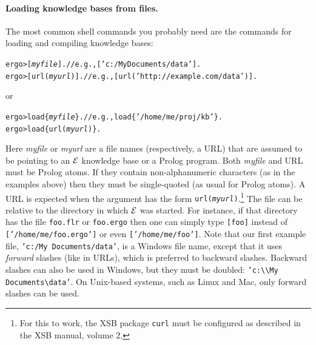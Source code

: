 \documentclass[11pt]{article}
\newcommand{\ERGO}{\mbox{\ensuremath{\cal{E}}\smaller{{\sc{RGO}}}}\xspace}
\newcommand{\FLSYSTEM}{\ERGO}
\newcommand{\prompt}{ergo> }
\newcommand{\flrext}{flr\xspace}
\newcommand{\ergoext}{ergo\xspace}
\newcommand{\bs}{\textbackslash}
\begin{document}
\paragraph{Loading knowledge bases from files.}
The most common shell commands you probably need are the commands for
loading and compiling knowledge bases:
\begin{alltt}
  \prompt  [\textnormal{\textit{myfile}}].        // e.g., ['c:/My Documents/data'].
  \prompt  [url(\textnormal{\textit{myurl}})].    // e.g., [url('http://example.com/data')].
\end{alltt}
or 
\begin{alltt}
  \prompt load\{\textnormal{\textit{myfile}}\}.     // e.g., load\{'/home/me/proj/kb'\}.
  \prompt load\{url(\textnormal{\textit{myurl}})\}.
\end{alltt}
Here \emph{myfile} or \emph{myurl} are a file names
(respectively, a URL) that are assumed to
be pointing to an \FLSYSTEM knowledge base
or a Prolog program. Both \emph{myfile} and URL must be
Prolog  atoms. If they contain non-alphanumeric characters (as in the examples
above) then they must be single-quoted (as usual for Prolog atoms).
A URL is expected
when the argument has the form {\tt url(\textit{myurl})}.\footnote{
  For this to work, the XSB package {\tt curl} must be configured as
  described in the XSB manual, volume 2. 
}
The file can be relative to the directory in which \FLSYSTEM was started.
For instance, if that directory has the file \texttt{foo.\flrext} or
\texttt{foo.\ergoext} then one
can simply type  \texttt{[foo]} instead of
\texttt{['/home/me/foo.\ergoext']}
or even \texttt{['/home/me/foo']}.
Note that our first example file, \texttt{'c:/My Documents/data'}, is a
Windows file name, except that it uses \emph{forward} slashes (like in
URLs), which is preferred to backward slashes. Backward slashes can also be used in
Windows,  but they must be doubled:
\texttt{'c:\bs\bs{}My Documents\bs{}data'}. On Unix-based systems, such as
Linux and Mac, only forward slashes can be used.
\end{document}
